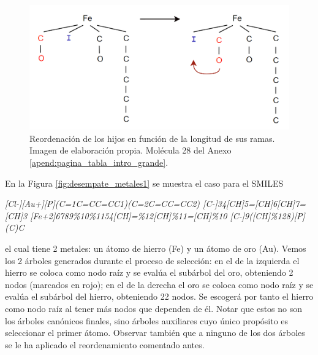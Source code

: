 \begin{figure}[h!]
    \centering
    \includegraphics[scale=0.4]{imagenes/diseno/canonizado/rearrange.png}
    \caption{Reordenación de los hijos en función de la longitud de sus ramas. Imagen de elaboración propia. Molécula 28 del Anexo \ref{apend:pagina_tabla_intro_grande}.}
    \label{fig:rearrangeTree}
\end{figure}

En la Figura \ref{fig:desempate_metales1} se muestra el caso para el SMILES 

\begin{center}
\textit{[Cl-][Au+][P](C=1C=CC=CC1)(C=2C=CC=CC2) [C-]34[CH]5=[CH]6[CH]7=[CH]3 [Fe+2]6789\%10\%1154[CH]=\%12[CH]\%11=[CH]\%10 [C-]9([CH]\%128)[P](C)C}
    
\end{center}

el cual tiene 2 metales: un átomo de hierro (Fe) y un átomo de oro (Au). Vemos los 2 árboles generados durante el proceso de selección: en el de la izquierda el hierro se coloca como nodo raíz y se evalúa el subárbol del oro, obteniendo 2 nodos (marcados en rojo); en el de la derecha el oro se coloca como nodo raíz y se evalúa el subárbol del hierro, obteniendo 22 nodos. Se escogerá por tanto el hierro como nodo raíz al tener más nodos que dependen de él. Notar que estos no son los árboles canónicos finales, sino árboles auxiliares cuyo único propósito es seleccionar el primer átomo. Observar también que a ninguno de los dos árboles se le ha aplicado el reordenamiento comentado antes.


